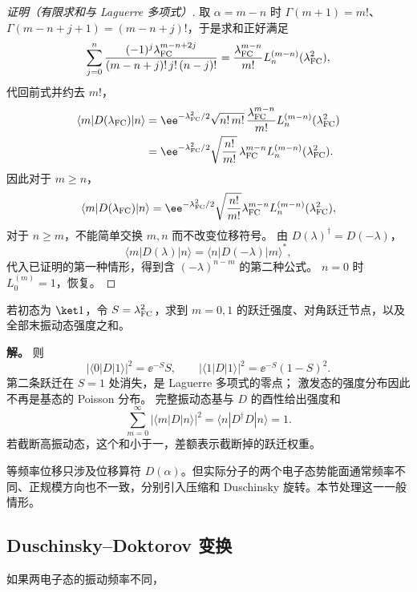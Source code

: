 \begin{proof}[证明（有限求和与 Laguerre 多项式）]
取 \(\alpha=m-n\) 时 \(\Gamma(m+1)=m!\)、\(\Gamma(m-n+j+1)=(m-n+j)!\)，于是求和正好满足
\begin{equation*}
\sum_{j=0}^{n}\frac{(-1)^j\lambda_{\rm FC}^{m-n+2j}}{(m-n+j)!\,j!\,(n-j)!}
=\frac{\lambda_{\rm FC}^{m-n}}{m!}
L_n^{(m-n)}(\lambda_{\rm FC}^2),
\end{equation*}
代回前式并约去 \(m!\)，
\begin{align*}
\langle m|D(\lambda_{\rm FC})|n\rangle
&=\ee^{-\lambda_{\rm FC}^2/2}\sqrt{n!\,m!}\,
\frac{\lambda_{\rm FC}^{m-n}}{m!}
L_n^{(m-n)}(\lambda_{\rm FC}^2)\\
&=\ee^{-\lambda_{\rm FC}^2/2}
\sqrt{\frac{n!}{m!}}\,\lambda_{\rm FC}^{m-n}
L_n^{(m-n)}(\lambda_{\rm FC}^2).
\end{align*}
因此对于 \(m\ge n\)，
\begin{equation*}
\langle m|D(\lambda_{\rm FC})|n\rangle
=\ee^{-\lambda_{\rm FC}^2/2}
\sqrt{\frac{n!}{m!}}
\lambda_{\rm FC}^{m-n}
L_n^{(m-n)}(\lambda_{\rm FC}^2),
\end{equation*}
对于 $n\ge m$，不能简单交换 $m,n$ 而不改变位移符号。
由 $D(\lambda)^\dagger=D(-\lambda)$，
\[
\langle m|D(\lambda)|n\rangle
=\langle n|D(-\lambda)|m\rangle^*,
\]
代入已证明的第一种情形，得到含 $(-\lambda)^{n-m}$ 的第二种公式。
$n=0$ 时 $L_0^{(m)}=1$，恢复。
\end{proof}

\begin{example}[激发振动态的节点与强度和]
若初态为 $\ket1$，令 $S=\lambda_{\rm FC}^2$，求到 $m=0,1$ 的跃迁强度、对角跃迁节点，以及全部末振动态强度之和。

\textbf{解。} 则
\[
|\langle0|D|1\rangle|^2=\ee^{-S}S,\qquad
|\langle1|D|1\rangle|^2=\ee^{-S}(1-S)^2.
\]
第二条跃迁在 $S=1$ 处消失，是 Laguerre 多项式的零点；
激发态的强度分布因此不再是基态的 Poisson 分布。
完整振动态基与 $D$ 的酉性给出强度和
\[
\sum_{m=0}^\infty |\langle m|D|n\rangle|^2
=\langle n|D^\dagger D|n\rangle=1.
\]
若截断高振动态，这个和小于一，差额表示截断掉的跃迁权重。
\end{example}


等频率位移只涉及位移算符 $D(\alpha)$。但实际分子的两个电子态势能面通常频率不同、正规模方向也不一致，分别引入压缩和 Duschinsky 旋转。本节处理这一一般情形。

\subsection{Duschinsky--Doktorov 变换}
如果两电子态的振动频率不同，

